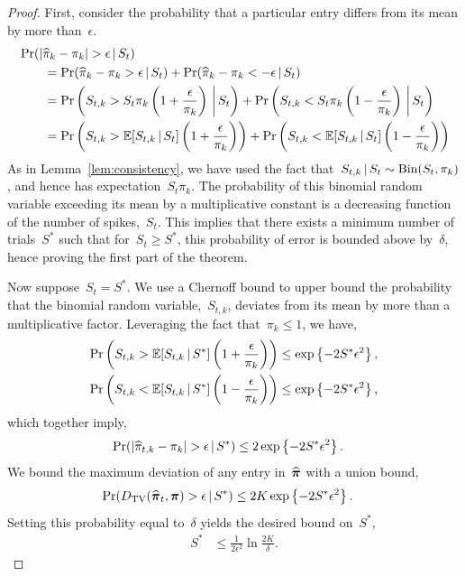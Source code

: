 \begin{proof}
First, consider the probability that a particular entry differs from its mean by more than~$\epsilon$.
\begin{align*}
  &\Pr(|\widehat{\pi}_k - \pi_k |  > \epsilon \,|\, S_t) \\
  &\qquad= \Pr(\widehat{\pi}_k - \pi_k  > \epsilon \,|\, S_t) + 
  \Pr(\widehat{\pi}_k - \pi_k  < -\epsilon \,|\, S_t) \\
  &\qquad= \Pr \left(S_{t, k} > S_t \pi_{ k} \left(1+\frac{\epsilon}{\pi_{ k}} \right) \, \bigg| \, S_t \right) 
  +\Pr \left(S_{t, k} < S_t \pi_{ k} \left(1-\frac{\epsilon}{\pi_{ k}} \right) \, \bigg| \, S_t\right) \\
  &\qquad= \Pr \left(S_{t, k} > \mathbb{E}[S_{t,k} \,|\, S_t] \left(1+\frac{\epsilon}{\pi_{ k}} \right) \right) 
   +\Pr \left(S_{t, k} < \mathbb{E}[S_{t,k} \,|\, S_t] \left(1-\frac{\epsilon}{\pi_{ k}} \right) \right)
\end{align*}
As in Lemma~\ref{lem:consistency}, we have used the fact
that~$S_{t, k} \,|\, S_t \sim \mathrm{Bin}(S_t, \pi_{ k})$,
and hence has expectation~$S_t \pi_{ k}$. 
The probability of this binomial random variable exceeding its mean 
by a multiplicative constant is a decreasing function of the 
number of spikes,~$S_t$. This implies that there exists a minimum 
number of trials~$S^*$ such that for~$S_t \geq S^*$, this probability 
of error is bounded above by~$\delta$, hence proving the first part 
of the theorem.

Now suppose~$S_t=S^*$.  We use a Chernoff bound to upper bound the
probability that the binomial random variable,~$S_{t,k}$, deviates
from its mean by more than a multiplicative factor. Leveraging the
fact that~$\pi_{k} \leq 1$, we have,
\begin{align*}
  \Pr \left(S_{t,k} > \mathbb{E}[S_{t,k} \,|\, S^*] \left(1+\frac{\epsilon}{\pi_{k}} \right) \right) 
  &\leq \exp \left \{-2S^* \epsilon^2 \right \}, \\
  \Pr \left(S_{t,k} < \mathbb{E}[S_{t,k} \,|\, S^*] \left(1-\frac{\epsilon}{\pi_{k}} \right) \right) 
  &\leq \exp \left \{-2S^* \epsilon^2 \right \},
\end{align*}
which together imply,
\begin{align*}
  \Pr(|\widehat{\pi}_{t,k} - \pi_{k} |  > \epsilon \,|\, S^*) 
  &\leq 2 \exp \left \{-2S^* \epsilon^2 \right \}.
\end{align*}
We bound the maximum deviation of any entry in~$\widehat{\boldsymbol{\pi}}$ with a union bound,
\begin{align*}
  \Pr({D_{\mathrm{TV}}}(\widehat{\boldsymbol{\pi}}_t, \boldsymbol{\pi}) > \epsilon \,|\, S^*) 
  & \leq 2K \exp \left\{-2S^* \epsilon^2 \right\}.
\end{align*}
Setting this probability equal to~$\delta$ yields the desired bound on~$S^*$,
\begin{align*}
  S^* &\leq \frac{1}{2\epsilon^2} \ln \frac{2K}{\delta}.
\end{align*}

\end{proof}


